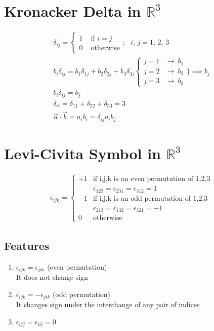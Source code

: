 \documentclass[a4paper, 11pt, normalem]{report}
\begin{document}
\section{Kronacker Delta in $\mathbb{R}^{3}$}
\begin{gather*}
    \delta_{ij} =
    \begin{cases}
        1 & \text{ if } i = j \\
        0 & \text{ otherwise}
    \end{cases}
    ;~~~ i,\,j = 1,\,2,\,3 \\
    b_{i}\delta_{ij} = b_{1}\delta_{1j} + b_{2}\delta_{2j} + b_{3}\delta_{3j}
    \begin{cases}
        j = 1 & \to ~ b_{1} \\
        j = 2 & \to ~ b_{2} \\
        j = 3 & \to ~ b_{3}
    \end{cases}
    \Bigg\} \implies b_{j} \\
    b_{i}\delta_{ij} = b_{j} \\
    \delta_{ii} = \delta_{11} + \delta_{22} + \delta_{33} = 3 \\
    \vec{a} \cdot \vec{b} = a_{i}b_{i} = \delta_{ij}a_{i}b_{j}
\end{gather*}

\section{Levi-Civita Symbol in $\mathbb{R}^3$}
\begin{gather*}
    \epsilon_{ijk} =
    \begin{cases}
        +1 & \text{if i,j,k is an even permutation of 1,2,3}       \\
           & \epsilon_{123} = \epsilon_{231} = \epsilon_{312} = 1  \\
        -1 & \text{if i,j,k is an odd permutation of 1,2,3}        \\
           & \epsilon_{213} = \epsilon_{132} = \epsilon_{321} = -1 \\
        0  & \text{otherwise}
    \end{cases}
\end{gather*}
\subsection{Features}
\begin{enumerate}
    \item $\epsilon_{ijk} = \epsilon_{jki}$ (even permutation) \\
          It does not change sign
    \item $\epsilon_{ijk} = -\epsilon_{jik}$ (odd permutation) \\
          It changes sign under the interchange of any pair of indices
    \item $\epsilon_{ijj} = \epsilon_{iii} = 0$
\end{enumerate}
\end{document}
